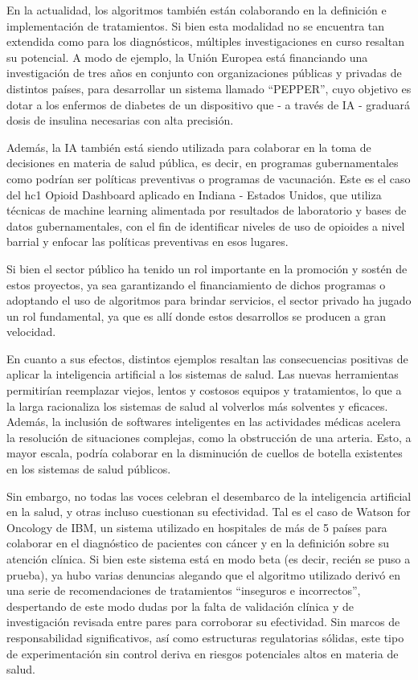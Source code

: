 \documentclass[journal]{IEEEtran}
\begin{document}
En la actualidad, los algoritmos también están colaborando en la definición e implementación de tratamientos. Si bien esta modalidad no se encuentra tan extendida como para los diagnósticos, múltiples investigaciones en curso resaltan su potencial. A modo de ejemplo, la Unión Europea está financiando una investigación de tres años en conjunto con organizaciones públicas y privadas de distintos países, para desarrollar un sistema llamado “PEPPER”, cuyo objetivo es dotar a los enfermos de diabetes de un dispositivo que - a través de IA - graduará dosis de insulina necesarias con alta precisión.

Además, la IA también está siendo utilizada para colaborar en la toma de decisiones en materia de salud pública, es decir, en programas gubernamentales como podrían ser políticas preventivas o programas de vacunación. Este es el caso del hc1 Opioid Dashboard aplicado en Indiana - Estados Unidos, que utiliza técnicas de machine learning alimentada por resultados de laboratorio y bases de datos gubernamentales, con el fin de identificar niveles de uso de opioides a nivel barrial y enfocar las políticas preventivas en esos lugares.

Si bien el sector público ha tenido un rol importante en la promoción y sostén de estos proyectos, ya sea garantizando el financiamiento de dichos programas o adoptando el uso de algoritmos para brindar servicios, el sector privado ha jugado un rol fundamental, ya que es allí donde estos desarrollos se producen a gran velocidad.

En cuanto a sus efectos, distintos ejemplos resaltan las consecuencias positivas de aplicar la inteligencia artificial a los sistemas de salud. Las nuevas herramientas permitirían reemplazar viejos, lentos y costosos equipos y tratamientos, lo que a la larga racionaliza los sistemas de salud al volverlos más solventes y eficaces. Además, la inclusión de softwares inteligentes en las actividades médicas acelera la resolución de situaciones complejas, como la obstrucción de una arteria. Esto, a mayor escala, podría colaborar en la disminución de cuellos de botella existentes en los sistemas de salud públicos.

Sin embargo, no todas las voces celebran el desembarco de la inteligencia artificial en la salud, y otras incluso cuestionan su efectividad. Tal es el caso de Watson for Oncology de IBM, un sistema utilizado en hospitales de más de 5 países para colaborar en el diagnóstico de pacientes con cáncer y en la definición sobre su atención clínica. Si bien este sistema está en modo beta (es decir, recién se puso a prueba), ya hubo varias denuncias alegando que el algoritmo utilizado derivó en una serie de recomendaciones de tratamientos “inseguros e incorrectos”, despertando de este modo dudas por la falta de validación clínica y de investigación revisada entre pares para corroborar su efectividad. Sin marcos de responsabilidad significativos, así como estructuras regulatorias sólidas, este tipo de experimentación sin control deriva en riesgos potenciales altos en materia de salud.
\end{document}
